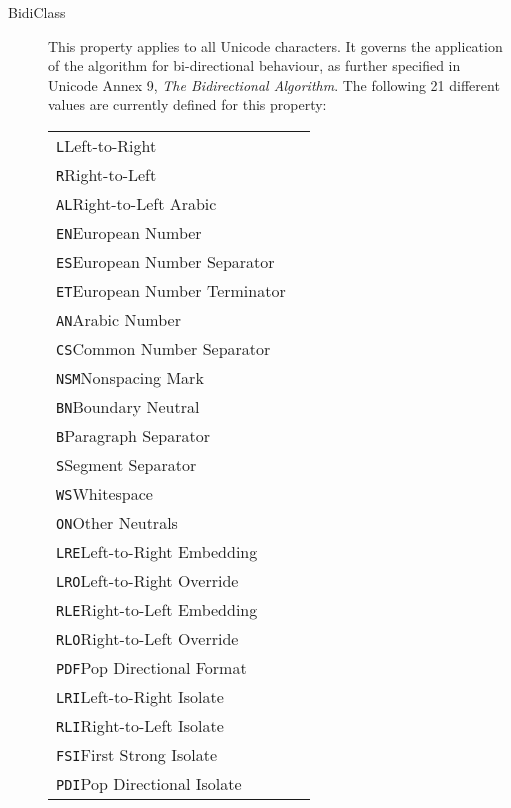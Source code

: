 \begin{description}
\item[{Bidi\textunderscore Class}]This property applies to all Unicode characters. It governs the application of the algorithm for bi-directional behaviour, as further specified in Unicode Annex 9, \textit{The Bidirectional Algorithm}. The following 21 different values are currently defined for this property:  \par 
\begin{longtable}{P{0.31676258992805756\textwidth}P{0.5332374100719425\textwidth}}
\texttt{L}\tabcellsep Left-to-Right\\
\texttt{R}\tabcellsep Right-to-Left\\
\texttt{AL}\tabcellsep Right-to-Left Arabic\\
\texttt{EN}\tabcellsep European Number\\
\texttt{ES}\tabcellsep European Number Separator\\
\texttt{ET}\tabcellsep European Number Terminator\\
\texttt{AN}\tabcellsep Arabic Number\\
\texttt{CS}\tabcellsep Common Number Separator\\
\texttt{NSM}\tabcellsep Nonspacing Mark\\
\texttt{BN}\tabcellsep Boundary Neutral\\
\texttt{B}\tabcellsep Paragraph Separator\\
\texttt{S}\tabcellsep Segment Separator\\
\texttt{WS}\tabcellsep Whitespace\\
\texttt{ON}\tabcellsep Other Neutrals\\
\texttt{LRE}\tabcellsep Left-to-Right Embedding\\
\texttt{LRO}\tabcellsep Left-to-Right Override\\
\texttt{RLE}\tabcellsep Right-to-Left Embedding\\
\texttt{RLO}\tabcellsep Right-to-Left Override\\
\texttt{PDF}\tabcellsep Pop Directional Format\\
\texttt{LRI}\tabcellsep Left-to-Right Isolate\\
\texttt{RLI}\tabcellsep Right-to-Left Isolate\\
\texttt{FSI}\tabcellsep First Strong Isolate\\
\texttt{PDI}\tabcellsep Pop Directional Isolate\end{longtable} \par
 

\end{description}
